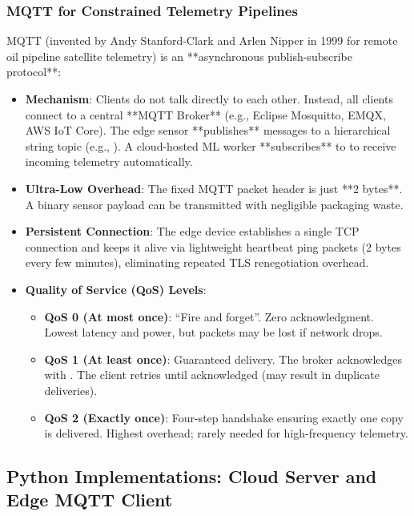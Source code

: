\subsubsection{MQTT for Constrained Telemetry Pipelines}
MQTT (invented by Andy Stanford-Clark and Arlen Nipper in 1999 for remote oil pipeline satellite telemetry) is an **asynchronous publish-subscribe protocol**:
\begin{itemize}
    \item \textbf{Mechanism}: Clients do not talk directly to each other. Instead, all clients connect to a central **MQTT Broker** (e.g., Eclipse Mosquitto, EMQX, AWS IoT Core). The edge sensor **publishes** messages to a hierarchical string topic (e.g., ). A cloud-hosted ML worker **subscribes** to  to receive incoming telemetry automatically.
    \item \textbf{Ultra-Low Overhead}: The fixed MQTT packet header is just **2 bytes**. A binary sensor payload can be transmitted with negligible packaging waste.
    \item \textbf{Persistent Connection}: The edge device establishes a single TCP connection and keeps it alive via lightweight heartbeat ping packets (2 bytes every few minutes), eliminating repeated TLS renegotiation overhead.
    \item \textbf{Quality of Service (QoS) Levels}:
    \begin{itemize}
        \item \textbf{QoS 0 (At most once)}: ``Fire and forget''. Zero acknowledgment. Lowest latency and power, but packets may be lost if network drops.
        \item \textbf{QoS 1 (At least once)}: Guaranteed delivery. The broker acknowledges with . The client retries until acknowledged (may result in duplicate deliveries).
        \item \textbf{QoS 2 (Exactly once)}: Four-step handshake ensuring exactly one copy is delivered. Highest overhead; rarely needed for high-frequency telemetry.
    \end{itemize}
\end{itemize}

\subsection{Python Implementations: Cloud Server and Edge MQTT Client}\label{subsec:code_implementations}

